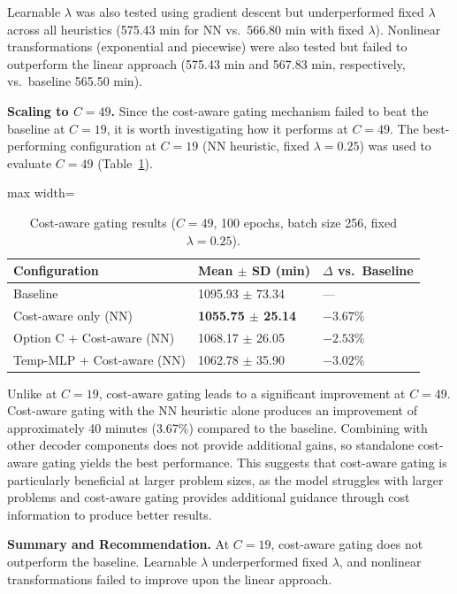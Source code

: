 Learnable $\lambda$ was also tested using gradient descent but underperformed fixed $\lambda$
across all heuristics (575.43 min for NN vs.\ 566.80 min with fixed $\lambda$). Nonlinear
transformations (exponential and piecewise) were also tested but failed to outperform the
linear approach (575.43 min and 567.83 min, respectively, vs.\ baseline 565.50 min).

\textbf{Scaling to $C = 49$.} Since the cost-aware gating mechanism failed to beat the baseline at $C = 19$, it is worth
investigating how it performs at $C = 49$. The best-performing configuration at $C = 19$
(NN heuristic, fixed $\lambda = 0.25$) was used to evaluate $C = 49$ (Table~\ref{tab:cost_aware_c49}).

\begin{table}[H]
\centering
\caption{Cost-aware gating results ($C = 49$, 100 epochs, batch size 256, fixed $\lambda =
0.25$).}
\label{tab:cost_aware_c49}
\begin{adjustbox}{max width=\textwidth}
\begin{tabular}{lll}
\toprule
\textbf{Configuration} & \textbf{Mean $\pm$ SD (min)} & \textbf{$\Delta$ vs.\ Baseline} \\
\midrule
Baseline                    & 1095.93 $\pm$ 73.34 & --- \\
Cost-aware only (NN)        & \textbf{1055.75 $\pm$ 25.14} & $-3.67\%$ \\
Option C + Cost-aware (NN)  & 1068.17 $\pm$ 26.05 & $-2.53\%$ \\
Temp-MLP + Cost-aware (NN)  & 1062.78 $\pm$ 35.90 & $-3.02\%$ \\
\bottomrule
\end{tabular}
\end{adjustbox}
\end{table}

Unlike at $C = 19$, cost-aware gating leads to a significant improvement at $C = 49$.
Cost-aware gating with the NN heuristic alone produces an improvement of approximately 40
minutes (3.67\%) compared to the baseline. Combining with other decoder components does not
provide additional gains, so standalone cost-aware gating yields the best performance. This
suggests that cost-aware gating is particularly beneficial at larger problem sizes, as the
model struggles with larger problems and cost-aware gating provides additional guidance
through cost information to produce better results.

\textbf{Summary and Recommendation.} At $C = 19$, cost-aware gating does not outperform the baseline. Learnable $\lambda$
underperformed fixed $\lambda$, and nonlinear transformations failed to improve upon the
linear approach.

